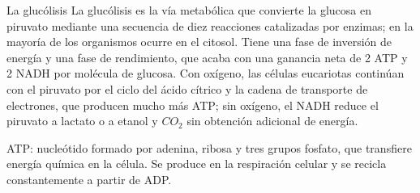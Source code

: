 \documentclass{book}
\begin{document}
\begin{tcolorbox}[title={Definición}, studiumdef, breakable]

La glucólisis
La glucólisis es la vía metabólica que convierte la glucosa en piruvato mediante una secuencia de diez reacciones catalizadas por enzimas; en la mayoría de los organismos ocurre en el citosol. Tiene una fase de inversión de energía y una fase de rendimiento, que acaba con una ganancia neta de 2 ATP y 2 NADH por molécula de glucosa. Con oxígeno, las células eucariotas continúan con el piruvato por el ciclo del ácido cítrico y la cadena de transporte de electrones, que producen mucho más ATP; sin oxígeno, el NADH reduce el piruvato a lactato o a etanol y \(CO_{2}\) sin obtención adicional de energía.

\end{tcolorbox}

\begin{tcolorbox}[title={Definición}, studiumdef, breakable]

ATP: nucleótido formado por adenina, ribosa y tres grupos fosfato, que transfiere energía química en la célula. Se produce en la respiración celular y se recicla constantemente a partir de ADP.

\end{tcolorbox}
\end{document}
